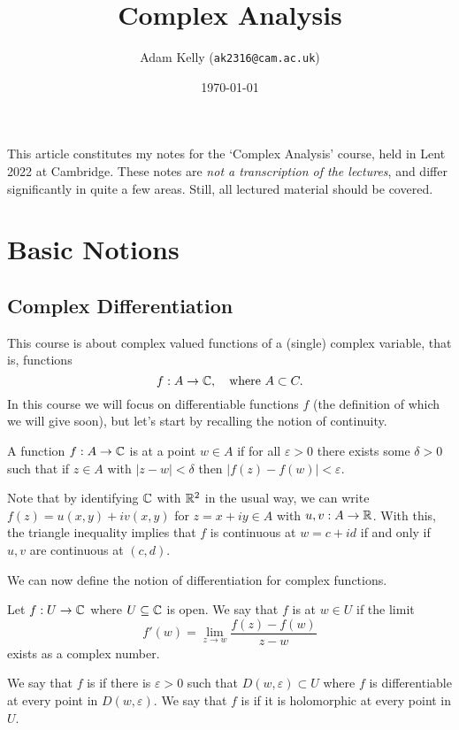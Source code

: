 \documentclass[a4paper]{scrartcl}
\title{Complex Analysis}
\author{Adam Kelly (\texttt{ak2316@cam.ac.uk})}
\date{\today}
\begin{document}
\maketitle


This article constitutes my notes for the `Complex Analysis' course, held in Lent 2022 at Cambridge. These notes are \emph{not a transcription of the lectures}, and differ significantly in quite a few areas. Still, all lectured material should be covered.



\tableofcontents


\section{Basic Notions}

\subsection{Complex Differentiation}

This course is about complex valued functions of a (single) complex variable, that is, functions
$$
f:A \rightarrow \mathbb{C}, \quad \text{where }A \subset C.
$$
In this course we will focus on differentiable functions $f$ (the definition of which we will give soon), but let's start by recalling the notion of continuity.

\begin{definition}[Continuity]
    A function $f: A \rightarrow \mathbb{C}$ is  at a point $w \in A$ if for all $\varepsilon > 0$ there exists some $\delta > 0$ such that if $z \in A$ with $|z - w| < \delta$ then $|f(z) - f(w)| < \varepsilon$.
\end{definition}

Note that by identifying $\mathbb{C}$ with $\mathbb{R}^2$ in the usual way, we can write
$
f(z) = u(x, y) + iv(x, y)
$
for $z = x + iy \in A$ with $u, v: A \rightarrow \mathbb{R}$. With this, the triangle inequality implies that $f$ is continuous at $w = c + id$ if and only if $u, v$ are continuous at $(c, d)$.

We can now define the notion of differentiation for complex functions.

\begin{definition}
    Let $f: U \rightarrow \mathbb{C}$ where $U \subseteq \mathbb{C}$ is open.   
    We say that $f$ is  at $w \in U$ if the limit
    $$
    f'(w) = \lim_{z \to w} \frac{f(z) - f(w)}{z - w}
    $$
    exists as a complex number.
\end{definition}
\begin{definition}[Holomorphic]
    We say that $f$ is  if there is $\varepsilon > 0$ such that $D(w, \varepsilon) \subset U$ where $f$ is differentiable at every point in $D(w, \varepsilon)$. We say that $f$ is  if it is holomorphic at every point in $U$.
\end{definition}
\end{document}

